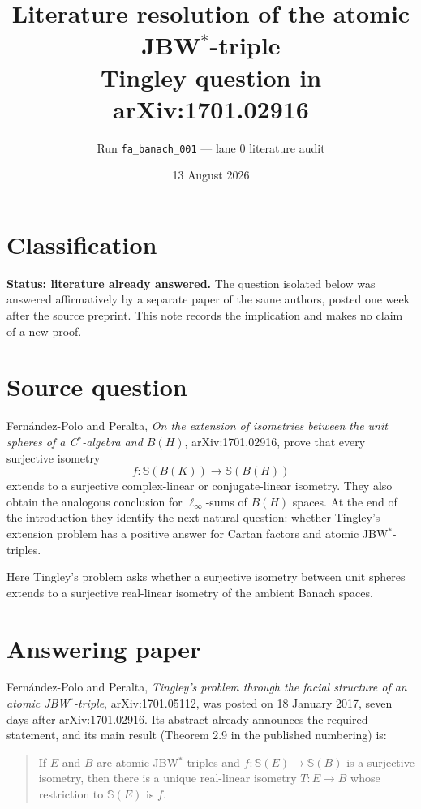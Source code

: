 \documentclass[11pt]{article}
\title{Literature resolution of the atomic JBW$^*$-triple\\Tingley question in arXiv:1701.02916}
\author{Run \texttt{fa\_banach\_001} --- lane 0 literature audit}
\date{13 August 2026}
\newcommand{\Sphere}{\mathbb S}
\begin{document}
\maketitle

\section*{Classification}

\textbf{Status: literature already answered.}  The question isolated below was
answered affirmatively by a separate paper of the same authors, posted one
week after the source preprint.  This note records the implication and makes
no claim of a new proof.

\section*{Source question}

Fern\'andez-Polo and Peralta, \emph{On the extension of isometries between the
unit spheres of a C$^*$-algebra and $B(H)$}, arXiv:1701.02916, prove that every
surjective isometry
\[
 f:\Sphere(B(K))\longrightarrow \Sphere(B(H))
\]
extends to a surjective complex-linear or conjugate-linear isometry.  They also
obtain the analogous conclusion for $\ell_\infty$-sums of $B(H)$ spaces.  At
the end of the introduction they identify the next natural question: whether
Tingley's extension problem has a positive answer for Cartan factors and
atomic JBW$^*$-triples.

Here Tingley's problem asks whether a surjective isometry between unit spheres
extends to a surjective real-linear isometry of the ambient Banach spaces.

\section*{Answering paper}

Fern\'andez-Polo and Peralta, \emph{Tingley's problem through the facial
structure of an atomic JBW$^*$-triple}, arXiv:1701.05112, was posted on
18 January 2017, seven days after arXiv:1701.02916.  Its abstract already
announces the required statement, and its main result (Theorem 2.9 in the
published numbering) is:

\begin{quote}
If $E$ and $B$ are atomic JBW$^*$-triples and
$f:\Sphere(E)\to\Sphere(B)$ is a surjective isometry, then there is a unique
real-linear isometry $T:E\to B$ whose restriction to $\Sphere(E)$ is $f$.
\end{quote}
\end{document}

